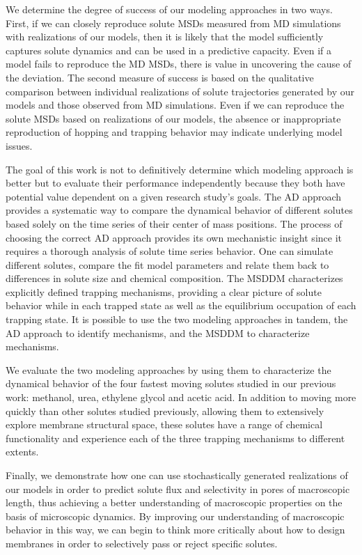 \documentclass[journal=jctcce,manuscript=article]{achemso}
\begin{document}
  We determine the degree of success of our modeling approaches in two ways.
  First, if we can closely reproduce solute MSDs measured from MD simulations
  with realizations of our models, then it is likely that the model
  sufficiently captures solute dynamics and can be used in a predictive
  capacity. Even if a model fails to reproduce the MD MSDs, there is value in
  uncovering the cause of the deviation. The second measure of success is based
  on the qualitative comparison between individual realizations of solute 
  trajectories generated by our models and those observed from MD simulations. 
  Even if we can reproduce the solute MSDs based on realizations of our models,
  the absence or inappropriate reproduction of hopping and trapping behavior may
  indicate underlying model issues. 
  
  The goal of this work is not to definitively determine which modeling
  approach is better but to evaluate their performance independently because
  they both have potential value dependent on a given research study's goals.
  The AD approach provides a systematic way to compare the dynamical behavior
  of different solutes based solely on the time series of their center of mass
  positions. The process of choosing the correct AD approach provides its own
  mechanistic insight since it requires a thorough analysis of solute time
  series behavior. One can simulate different solutes, compare the fit model
  parameters and relate them back to differences in solute size and chemical
  composition. The MSDDM characterizes explicitly defined trapping mechanisms,
  providing a clear picture of solute behavior while in each trapped state as
  well as the equilibrium occupation of each trapping state.  It is possible to
  use the two modeling approaches in tandem, the AD approach to identify
  mechanisms, and the MSDDM to characterize mechanisms. 
  
  We evaluate the two modeling approaches by using them to characterize the
  dynamical behavior of the four fastest moving solutes studied in our previous
  work: methanol, urea, ethylene glycol and acetic acid. In addition to moving
  more quickly than other solutes studied previously, allowing them to extensively
  explore membrane structural space, these solutes have a range of chemical 
  functionality and experience each of the three trapping mechanisms to different extents.
  
  Finally, we demonstrate how one can use stochastically generated realizations
  of our models in order to predict solute flux and selectivity in pores of 
  macroscopic length, thus achieving a better understanding of macroscopic 
  properties on the basis of microscopic dynamics. By improving our 
  understanding of macroscopic behavior in this way, we can begin to think more
  critically about how to design membranes in order to selectively pass or 
  reject specific solutes.
    
\end{document}
